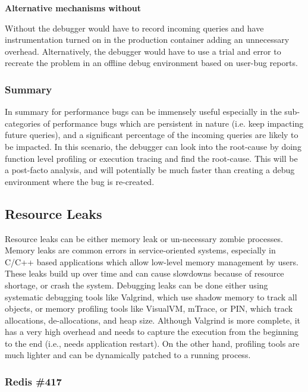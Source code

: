 \noindent \textbf{Alternative mechanisms without \parikshan}

Without \parikshan the debugger would have to record incoming queries and have instrumentation turned on in the production container adding an unnecessary overhead. Alternatively, the debugger would have to use a trial and error to recreate the problem in an offline debug environment based on user-bug reports.\\

\subsubsection{Summary}

In summary for performance bugs \parikshan can be immensely useful especially in the sub-categories of performance bugs which are persistent in nature (i.e. keep impacting future queries), and a significant percentage of the incoming queries are likely to be impacted. In this scenario, the debugger can look into the root-cause by doing function level profiling or execution tracing and find the root-cause. This will be a post-facto analysis, and will potentially be much faster than creating a debug environment where the bug is re-created.



\subsection{Resource Leaks}
Resource leaks can be either memory leak or un-necessary zombie processes.
Memory leaks are common errors in service-oriented systems, especially in C/C++ based applications which allow low-level memory management by users.
These leaks build up over time and can cause slowdowns because of resource shortage, or crash the system.
Debugging leaks can be done either using systematic debugging tools like Valgrind, which use shadow memory to track all objects, or memory profiling tools like VisualVM, mTrace, or PIN, which track allocations, de-allocations, and heap size.
Although Valgrind is more complete, it has a very high overhead and needs to capture the execution from the beginning to the end (i.e., needs application restart).
On the other hand, profiling tools are much lighter and can be dynamically patched to a running process.



\subsubsection{Redis \#417}

